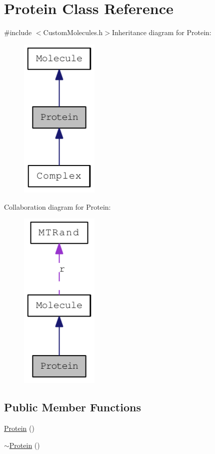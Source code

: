 \hypertarget{classProtein}{
\section{Protein Class Reference}
\label{classProtein}
}


{\ttfamily \#include $<$CustomMolecules.h$>$}Inheritance diagram for Protein:\nopagebreak
\begin{figure}[H]
\begin{center}
\leavevmode
\includegraphics[width=106pt]{classProtein__inherit__graph}
\end{center}
\end{figure}
Collaboration diagram for Protein:\nopagebreak
\begin{figure}[H]
\begin{center}
\leavevmode
\includegraphics[width=106pt]{classProtein__coll__graph}
\end{center}
\end{figure}
\subsection*{Public Member Functions}
\begin{DoxyCompactItemize}
\item 
\hyperlink{classProtein_a4610c6369d2f7e4bd31481d53e5001a1}{Protein} ()
\item 
\hyperlink{classProtein_a86b3ed374eead087b00d556915a584f6}{$\sim$Protein} ()
\end{DoxyCompactItemize}


